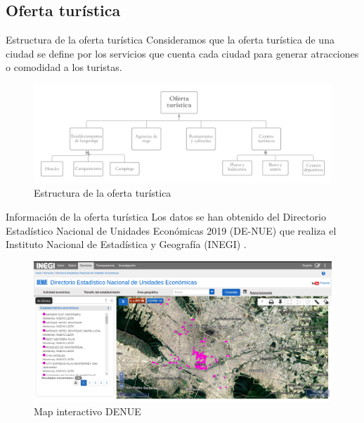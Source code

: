 \subsection{Oferta turística}
\begin{frame}{Estructura de la oferta turística}
Consideramos que la oferta turística de una ciudad se define por los servicios que cuenta cada ciudad para generar atracciones o comodidad a los turistas.
    \begin{figure}
        \centering
        \includegraphics[scale=0.2]{figure/diagrama_oferta.png}
        \caption{Estructura de la oferta turística}
        \label{fig:diagrama_oferta}
    \end{figure}
\end{frame}
\begin{frame}{Información de la oferta turística}
    Los datos se han obtenido del Directorio Estadístico Nacional de Unidades Económicas 2019 (DE-NUE) que realiza el Instituto Nacional de Estadística y Geografía (INEGI) \citep{denue}.
    \begin{figure}
        \centering
        \includegraphics[scale=0.22]{figure/denue_mapa_interactivo.png}
        \caption{Map interactivo DENUE}
        \label{fig:denue_mapa_interactivo}
    \end{figure}
\end{frame}

